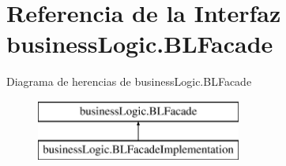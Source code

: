\hypertarget{interfacebusinessLogic_1_1BLFacade}{}\section{Referencia de la Interfaz business\+Logic.\+B\+L\+Facade}
\label{interfacebusinessLogic_1_1BLFacade}
Diagrama de herencias de business\+Logic.\+B\+L\+Facade\begin{figure}[H]
\begin{center}
\leavevmode
\includegraphics[height=2.000000cm]{interfacebusinessLogic_1_1BLFacade}
\end{center}
\end{figure}
